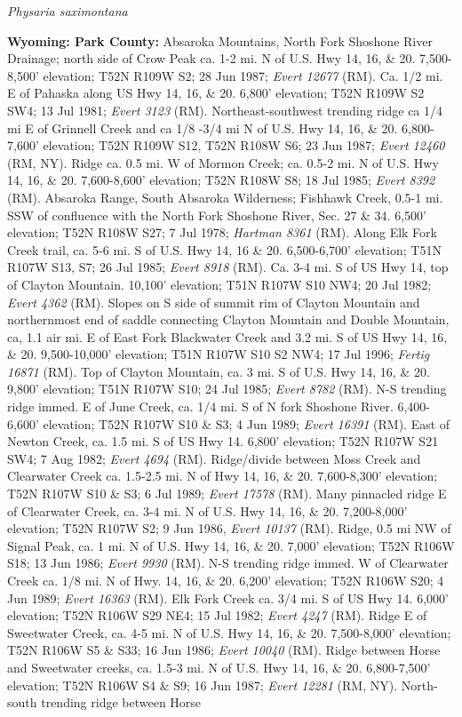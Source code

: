 \begin{center}
\textit{Physaria saximontana}
\end{center}

\textbf{Wyoming: Park County:} Absaroka Mountains, North Fork Shoshone River Drainage; north side of Crow Peak ca. 1-2 mi. N of U.S. Hwy 14, 16, \& 20. 7,500-8,500’ elevation; T52N R109W S2; 28 Jun 1987; \textit{Evert 12677} (RM).  Ca. 1/2 mi. E of Pahaska along US Hwy 14, 16, \& 20. 6,800’ elevation; T52N R109W S2 SW4; 13 Jul 1981; \textit{Evert 3123} (RM).  Northeast-southwest trending ridge ca 1/4 mi E of Grinnell Creek and ca 1/8 -3/4 mi N of U.S. Hwy 14, 16, \& 20. 6,800-7,600’ elevation; T52N R109W S12, T52N R108W S6; 23 Jun 1987; \textit{Evert 12460} (RM, NY).  Ridge ca. 0.5 mi. W of Mormon Creek; ca. 0.5-2 mi. N of U.S. Hwy 14, 16, \& 20. 7,600-8,600’ elevation; T52N R108W S8; 18 Jul 1985; \textit{Evert 8392} (RM).  Absaroka Range, South Absaroka Wilderness; Fishhawk Creek, 0.5-1 mi. SSW of confluence with the North Fork Shoshone River, Sec. 27 \& 34. 6,500’ elevation; T52N R108W S27; 7 Jul 1978; \textit{Hartman 8361} (RM).  Along Elk Fork Creek trail, ca. 5-6 mi. S of U.S. Hwy 14, 16 \& 20. 6,500-6,700’ elevation; T51N R107W S13, S7; 26 Jul 1985; \textit{Evert 8918} (RM).  Ca. 3-4 mi. S of US Hwy 14, top of Clayton Mountain. 10,100’ elevation; T51N R107W S10 NW4; 20 Jul 1982; \textit{Evert 4362} (RM).  Slopes on S side of summit rim of Clayton Mountain and northernmost end of saddle connecting Clayton Mountain and Double Mountain, ca, 1.1 air mi. E of East Fork Blackwater Creek and 3.2 mi. S of US Hwy 14, 16, \& 20. 9,500-10,000’ elevation; T51N R107W S10 S2 NW4; 17 Jul 1996; \textit{Fertig 16871} (RM).  Top of Clayton Mountain, ca. 3 mi. S of U.S. Hwy 14, 16, \& 20. 9,800’ elevation; T51N R107W S10; 24 Jul 1985; \textit{Evert 8782} (RM).  N-S trending ridge immed. E of June Creek, ca. 1/4 mi. S of N fork Shoshone River. 6,400-6,600’ elevation; T52N R107W S10 \& S3; 4 Jun 1989; \textit{Evert 16391} (RM).  East of Newton Creek, ca. 1.5 mi. S of US Hwy 14. 6,800’ elevation; T52N R107W S21 SW4; 7 Aug 1982; \textit{Evert 4694} (RM).  Ridge/divide between Moss Creek and Clearwater Creek ca. 1.5-2.5 mi. N of Hwy 14, 16, \& 20. 7,600-8,300’ elevation; T52N R107W S10 \& S3; 6 Jul 1989; \textit{Evert 17578} (RM).  Many pinnacled ridge E of Clearwater Creek, ca. 3-4 mi. N of U.S. Hwy 14, 16, \& 20. 7,200-8,000’ elevation; T52N R107W S2; 9 Jun 1986, \textit{Evert 10137} (RM).  Ridge, 0.5 mi NW of Signal Peak, ca. 1 mi. N of U.S. Hwy 14, 16, \& 20. 7,000’ elevation; T52N R106W S18; 13 Jun 1986; \textit{Evert 9930} (RM).  N-S trending ridge immed. W of Clearwater Creek ca. 1/8 mi. N of Hwy. 14, 16, \& 20. 6,200’ elevation; T52N R106W S20; 4 Jun 1989; \textit{Evert 16363} (RM).  Elk Fork Creek ca. 3/4 mi. S of US Hwy 14. 6,000’ elevation; T52N R106W S29 NE4; 15 Jul 1982; \textit{Evert 4247} (RM).  Ridge E of Sweetwater Creek, ca. 4-5 mi. N of U.S. Hwy 14, 16, \& 20. 7,500-8,000’ elevation;  T52N R106W S5 \& S33; 16 Jun 1986; \textit{Evert 10040} (RM).  Ridge between Horse and Sweetwater creeks, ca. 1.5-3 mi. N of U.S. Hwy 14, 16, \& 20. 6,800-7,500’ elevation; T52N R106W S4 \& S9; 16 Jun 1987; \textit{Evert 12281} (RM, NY).  North-south trending ridge between Horse 